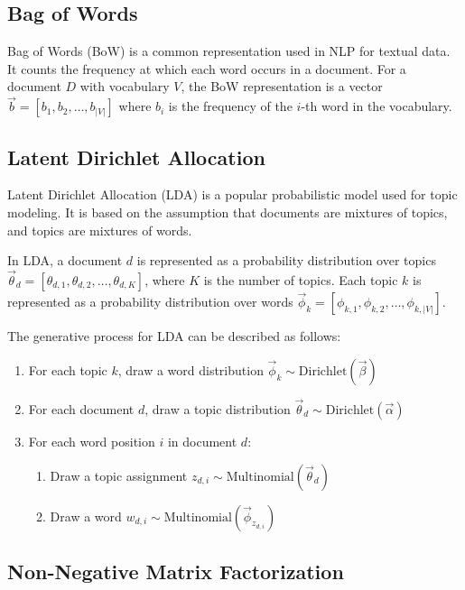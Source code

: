 \documentclass{article}
\begin{document}
\subsection{Bag of Words}

Bag of Words (BoW) is a common representation used in NLP for textual data. It counts the frequency at which each word occurs in a document. For a document $D$ with vocabulary $V$, the BoW representation is a vector $\vec{b} = [b_1, b_2, \ldots, b_{|V|}]$ where $b_i$ is the frequency of the $i$-th word in the vocabulary.

\subsection{Latent Dirichlet Allocation}

Latent Dirichlet Allocation (LDA) is a popular probabilistic model used for topic modeling. It is based on the assumption that documents are mixtures of topics, and topics are mixtures of words.

In LDA, a document $d$ is represented as a probability distribution over topics $\vec{\theta}_d = [\theta_{d,1}, \theta_{d,2}, \ldots, \theta_{d,K}]$, where $K$ is the number of topics. Each topic $k$ is represented as a probability distribution over words $\vec{\phi}_k = [\phi_{k,1}, \phi_{k,2}, \ldots, \phi_{k,|V|}]$.

The generative process for LDA can be described as follows:
\begin{enumerate}
    \item For each topic $k$, draw a word distribution $\vec{\phi}_k \sim \textrm{Dirichlet}(\vec{\beta})$
    \item For each document $d$, draw a topic distribution $\vec{\theta}_d \sim \textrm{Dirichlet}(\vec{\alpha})$
    \item For each word position $i$ in document $d$:
    \begin{enumerate}
        \item Draw a topic assignment $z_{d,i} \sim \textrm{Multinomial}(\vec{\theta}_d)$
        \item Draw a word $w_{d,i} \sim \textrm{Multinomial}(\vec{\phi}_{z_{d,i}})$
    \end{enumerate}
\end{enumerate}

\subsection{Non-Negative Matrix Factorization}
\end{document}
